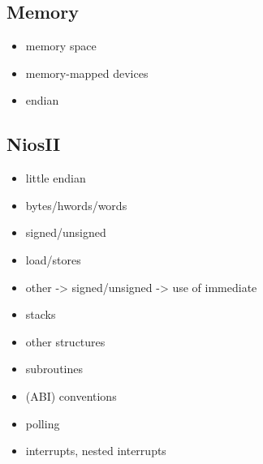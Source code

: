 \documentclass[11pt]{article}
\begin{document}
\subsection{Memory}
\label{sec:orgheadline87}
\begin{itemize}
\item memory space
\item memory-mapped devices
\item endian
\end{itemize}
\subsection{NiosII}
\label{sec:orgheadline88}
\begin{itemize}
\item little endian
\item bytes/hwords/words
\item signed/unsigned
\item load/stores
\item other -> signed/unsigned -> use of immediate
\item stacks
\item other structures
\item subroutines
\item (ABI) conventions
\item polling
\item interrupts, nested interrupts
\end{itemize}
\end{document}
